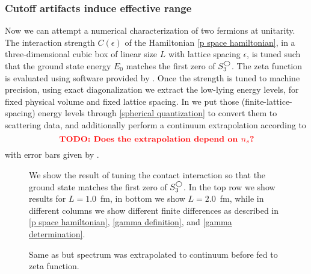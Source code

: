 \subsubsection{Cutoff artifacts induce effective range}

Now we can attempt a numerical characterization of {\color{red} two} fermions at unitarity.
The interaction strength $C(\epsilon)$ of the Hamiltonian \eqref{p space hamiltonian}, in a three-dimensional cubic box of linear size $L$ with lattice spacing $\epsilon$, is tuned such that the ground state energy $E_0$ matches the first zero of $S^{\bigcirc}_3$.
The zeta function is evaluated using software provided by .
Once the strength is tuned to machine precision, using exact diagonalization we extract the low-lying energy levels, for fixed physical volume and fixed lattice spacing.
In  we put those (finite-lattice-spacing) energy levels through \eqref{spherical quantization} to convert them to scattering data, and additionally perform a continuum extrapolation according to
\begin{equation}
    \text{{\bf\color{red}TODO: Does the extrapolation depend on \ensuremath{{n_s}}?}}
\end{equation}
with error bars given by .  

\begin{figure}[th]
    
    \caption{We show the result of tuning the contact interaction so that the ground state matches the first zero of $S^{\bigcirc}_3$.  In the top row we show results for $L=1.0$~fm, in bottom we show $L=2.0$~fm, while in different columns we show different finite differences as described in \eqref{p space hamiltonian}, \eqref{gamma definition}, and \eqref{gamma determination}. }
    \label{fig:unimproved spherical}
\end{figure}

\begin{figure}[th]
    
    \caption{Same as  but spectrum was extrapolated to continuum before fed to zeta function.}
    \label{fig:unimproved spherical continuum extrapolation}
\end{figure}

